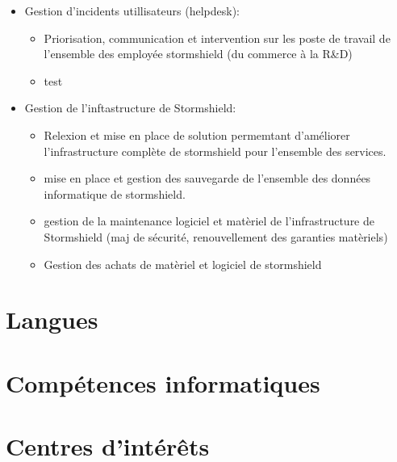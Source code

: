 \documentclass[11pt,a4paper,sans]{moderncv}
\begin{document}
	{%
		\begin{itemize}%
		\item Gestion d'incidents utillisateurs (helpdesk):
			\begin{itemize}%
			\item Priorisation, communication et intervention sur les poste de travail de l'ensemble des employée stormshield (du commerce à la R&D)
			\item test
			\end{itemize}
		\end{itemize}
		\begin{itemize}%
		\item Gestion de l'inftastructure de Stormshield:
			\begin{itemize}%
			\item Relexion et mise en place de solution permemtant d'améliorer l'infrastructure complète de stormshield pour l'ensemble des services.
			\item mise en place et gestion des sauvegarde de l'ensemble des données informatique de stormshield.
			\item gestion de la maintenance logiciel et matèriel de l'infrastructure de Stormshield (maj de sécurité, renouvellement des garanties matèriels)
			\item Gestion des achats de matèriel et logiciel de stormshield
			\end{itemize}
		\end{itemize}
		}	
	{%

	}
\section{Langues}
\section{Compétences informatiques}
\section{Centres d'intérêts}
\end{document}
